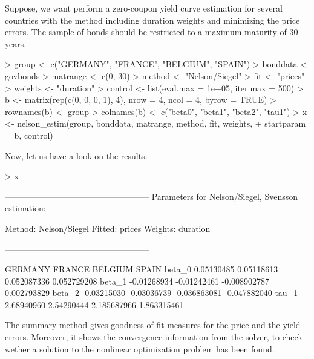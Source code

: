Suppose, we want perform a zero-coupon yield curve estimation for several countries with the \cite{Nelson1987} method including duration weights and minimizing the price errors. The sample of bonds should be restricted to a maximum maturity of 30 years. 

\begin{Schunk}
\begin{Sinput}
> group <- c("GERMANY", "FRANCE", "BELGIUM", "SPAIN")
> bonddata <- govbonds
> matrange <- c(0, 30)
> method <- "Nelson/Siegel"
> fit <- "prices"
> weights <- "duration"
> control <- list(eval.max = 1e+05, iter.max = 500)
> b <- matrix(rep(c(0, 0, 0, 1), 4), nrow = 4, ncol = 4, byrow = TRUE)
> rownames(b) <- group
> colnames(b) <- c("beta0", "beta1", "beta2", "tau1")
> x <- nelson_estim(group, bonddata, matrange, method, fit, weights, 
+     startparam = b, control)
\end{Sinput}
\end{Schunk}

Now, let us have a look on the results.

\begin{Schunk}
\begin{Sinput}
> x
\end{Sinput}
\begin{Soutput}
---------------------------------------------------
Parameters for Nelson/Siegel, Svensson estimation:

Method: Nelson/Siegel 
Fitted: prices 
Weights: duration 

---------------------------------------------------

           GERMANY      FRANCE      BELGIUM        SPAIN
beta_0  0.05130485  0.05118613  0.052087336  0.052729208
beta_1 -0.01268934 -0.01242461 -0.008902787  0.002793829
beta_2 -0.03215030 -0.03036739 -0.036863081 -0.047882040
tau_1   2.68940960  2.54290444  2.185687966  1.863315461
\end{Soutput}
\end{Schunk}

The summary method gives goodness of fit measures for the price and the yield errors. Moreover, it shows the convergence information from the solver, to check wether a solution to the nonlinear optimization problem has been found.


